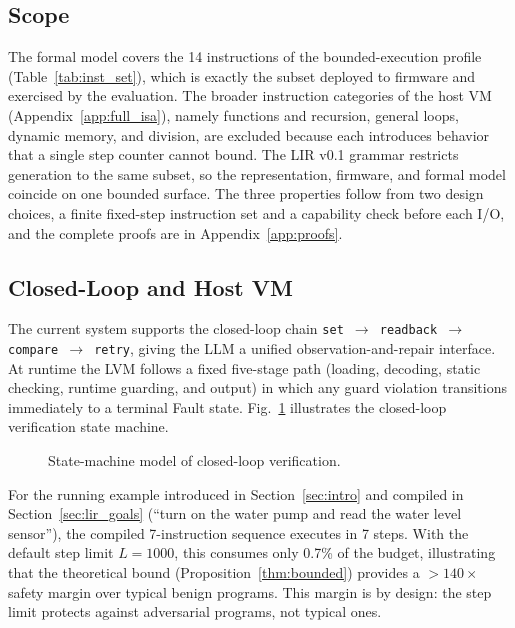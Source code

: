 \documentclass[a4paper,fleqn,longmktitle]{cas-dc}
\begin{document}
\subsection{Scope}
\label{sec:formal_scope}

The formal model covers the 14 instructions of the bounded-execution profile (Table~\ref{tab:inst_set}), which is exactly the subset deployed to firmware and exercised by the evaluation. The broader instruction categories of the host VM (Appendix~\ref{app:full_isa}), namely functions and recursion, general loops, dynamic memory, and division, are excluded because each introduces behavior that a single step counter cannot bound. The LIR v0.1 grammar restricts generation to the same subset, so the representation, firmware, and formal model coincide on one bounded surface. The three properties follow from two design choices, a finite fixed-step instruction set and a capability check before each I/O, and the complete proofs are in Appendix~\ref{app:proofs}.

\subsection{Closed-Loop and Host VM}
\label{sec:closed_loop}

The current system supports the closed-loop chain \texttt{set $\to$ readback $\to$ compare $\to$ retry}, giving the LLM a unified observation-and-repair interface. At runtime the LVM follows a fixed five-stage path (loading, decoding, static checking, runtime guarding, and output) in which any guard violation transitions immediately to a terminal Fault state. Fig.~\ref{fig:fsm} illustrates the closed-loop verification state machine.

\begin{figure}[tp]
  \centering
  
  \caption{State-machine model of closed-loop verification.}
  \label{fig:fsm}
\end{figure}

\begin{rmk}
For the running example introduced in Section~\ref{sec:intro} and compiled in Section~\ref{sec:lir_goals} (``turn on the water pump and read the water level sensor''), the compiled 7-instruction sequence executes in 7 steps. With the default step limit $L=1000$, this consumes only 0.7\% of the budget, illustrating that the theoretical bound (Proposition~\ref{thm:bounded}) provides a $>\!140\times$ safety margin over typical benign programs. This margin is by design: the step limit protects against adversarial programs, not typical ones.
\end{rmk}
\end{document}
